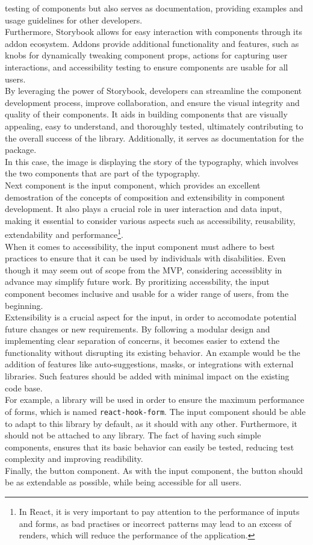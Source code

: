 \documentclass[./memory.tex]{subfiles}
\begin{document}
testing of components but also serves as documentation, providing examples and
usage guidelines for other developers.
\\
Furthermore, Storybook allows for easy interaction with components through its
addon ecosystem. Addons provide additional functionality and features, such as
knobs for dynamically tweaking component props, actions for capturing user
interactions, and accessibility testing to ensure components are usable for all
users.
\\
By leveraging the power of Storybook, developers can streamline the component
development process, improve collaboration, and ensure the visual integrity and
quality of their components. It aids in building components that are visually
appealing, easy to understand, and thoroughly tested, ultimately contributing to
the overall success of the library. Additionally, it serves as documentation for
the package.
\\[8pt]
In this case, the image is displaying the story of the typography, which
involves the two components that are part of the typography.
\\[8pt]
Next component is the input component, which provides an excellent demostration
of the concepts of composition and extensibility in component development. It
also plays a crucial role in user interaction and data input, making it
essential to consider various aspects such as accessibility, reusability,
extendability and performance\footnote{In React, it is very important to pay
	attention to the performance of inputs and forms, as bad practises or incorrect
	patterns may lead to an excess of renders, which will reduce the performance of
	the application.}.
\\
When it comes to accessibility, the input component must adhere to best
practices to ensure that it can be used by individuals with disabilities. Even
though it may seem out of scope from the MVP, considering accessiblity in
advance may simplify future work. By proritizing accessbility, the input
component becomes inclusive and usable for a wider range of users, from the
beginning.
\\
Extensibility is a crucial aspect for the input, in order to accomodate
potential future changes or new requirements. By following a modular design and
implementing clear separation of concerns, it becomes easier to extend the
functionality without disrupting its existing behavior. An example would be the
addition of features like auto-suggestions, masks, or integrations with external
libraries. Such features should be added with minimal impact on the existing
code base.
\\
For example, a library will be used in order to ensure the maximum performance
of forms, which is named \texttt{react-hook-form}. The input component should be
able to adapt to this library by default, as it should with any other.
Furthermore, it should not be attached to any library. The fact of having such
simple components, ensures that its basic behavior can easily be tested,
reducing test complexity and improving readibility.
\\[8pt]
Finally, the button component. As with the input component, the button should be
as extendable as possible, while being accessible for all users.
\end{document}
